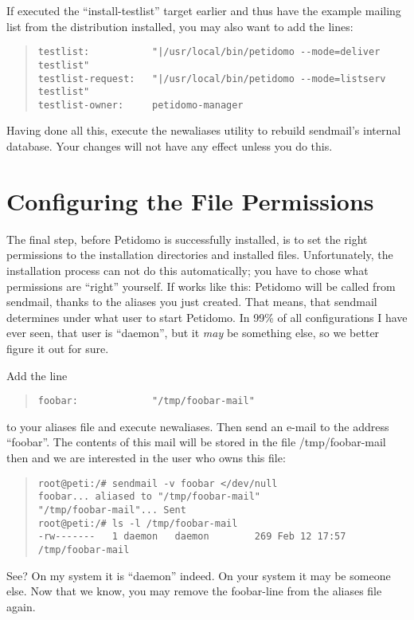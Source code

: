 \documentclass[a4paper,10pt]{scrreprt}
\begin{document}
If executed the ``install-testlist'' target earlier and thus have the
example mailing list from the distribution installed, you may also
want to add the lines:
\begin{quote}
\begin{verbatim}
testlist:           "|/usr/local/bin/petidomo --mode=deliver testlist"
testlist-request:   "|/usr/local/bin/petidomo --mode=listserv testlist"
testlist-owner:     petidomo-manager
\end{verbatim}
\end{quote}
Having done all this, execute the {\sf newaliases} utility to rebuild
sendmail's internal database. Your changes will not have any effect
unless you do this.

\section{Configuring the File Permissions}

The final step, before Petidomo is successfully installed, is to set
the right permissions to the installation directories and installed
files. Unfortunately, the installation process can not do this
automatically; you have to chose what permissions are ``right''
yourself. If works like this: Petidomo will be called from sendmail,
thanks to the aliases you just created. That means, that sendmail
determines under what user to start Petidomo. In 99\% of all
configurations I have ever seen, that user is ``daemon'', but it
\emph{may} be something else, so we better figure it out for sure.

Add the line
\begin{quote}
\begin{verbatim}
foobar:             "/tmp/foobar-mail"
\end{verbatim}
\end{quote}
to your aliases file and execute {\sf newaliases}. Then send an e-mail
to the address ``foobar''. The contents of this mail will be stored in
the file {\sf /tmp/foobar-mail} then and we are interested in the user
who owns this file:
\begin{quote}
\begin{verbatim}
root@peti:/# sendmail -v foobar </dev/null
foobar... aliased to "/tmp/foobar-mail"
"/tmp/foobar-mail"... Sent
root@peti:/# ls -l /tmp/foobar-mail
-rw-------   1 daemon   daemon        269 Feb 12 17:57 /tmp/foobar-mail
\end{verbatim}
\end{quote}
See? On my system it is ``daemon'' indeed. On your system it may be
someone else. Now that we know, you may remove the foobar-line from
the aliases file again.
\end{document}
